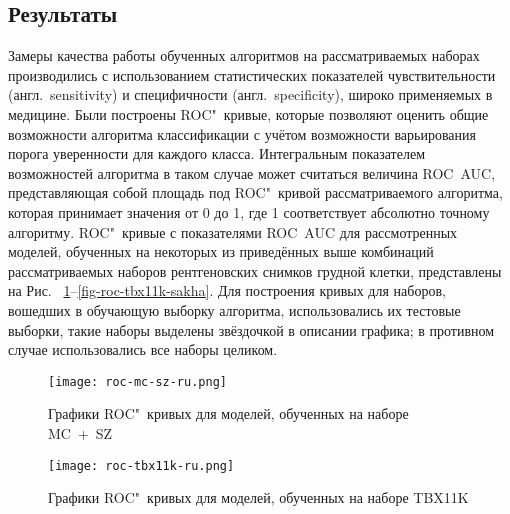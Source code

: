 \subsection{Результаты}
Замеры качества работы обученных алгоритмов на рассматриваемых наборах производились с использованием статистических показателей чувствительности (англ.~sensitivity) и специфичности (англ.~specificity), широко применяемых в медицине. Были построены ROC"~кривые, которые позволяют оценить общие возможности алгоритма классификации с учётом возможности варьирования порога уверенности для каждого класса. Интегральным показателем возможностей алгоритма в таком случае может считаться величина ROC~AUC, представляющая собой площадь под ROC"~кривой рассматриваемого алгоритма, которая принимает значения от 0 до 1, где 1 соответствует абсолютно точному алгоритму. ROC"~кривые с показателями ROC~AUC для рассмотренных моделей, обученных на некоторых из приведённых выше комбинаций рассматриваемых наборов рентгеновских снимков грудной клетки, представлены на Рис.~
\ref{fig-roc-mc-sz}--\ref{fig-roc-tbx11k-sakha}.
Для построения кривых для наборов, вошедших в обучающую выборку алгоритма, использовались их тестовые выборки, такие наборы выделены звёздочкой в описании графика; в противном случае использовались все наборы целиком.

\begin{figure}[ht]%
	\centering
	\texttt{[image: roc-mc-sz-ru.png]}
	\caption{Графики ROC"~кривых для моделей, обученных на наборе MC~+~SZ}\label{fig-roc-mc-sz}
\end{figure}
%
%
\begin{figure}[ht]%
	\centering
	\texttt{[image: roc-tbx11k-ru.png]}
	\caption{Графики ROC"~кривых для моделей, обученных на наборе TBX11K}\label{fig-roc-tbx11k}
\end{figure}


